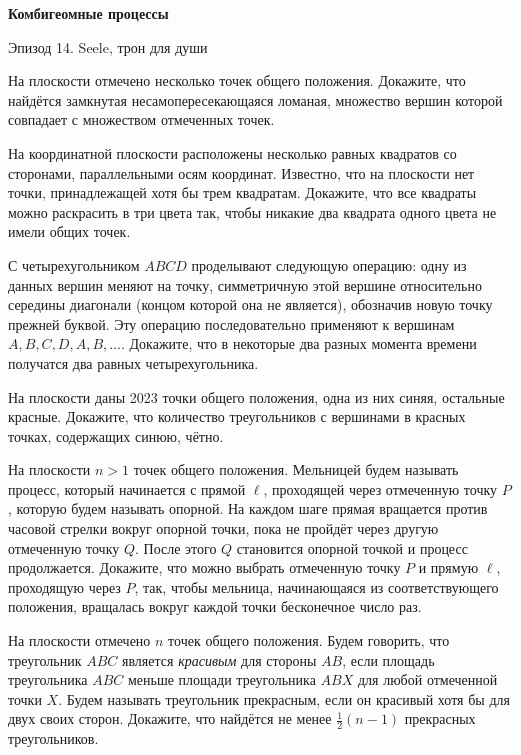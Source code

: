 \centerline{\bf \Huge Комбигеомные процессы}

\begin{flushright}
        \scriptsize{Эпизод 14. Seele, трон для души }
\end{flushright}

На плоскости отмечено несколько точек общего положения. Докажите, что найдётся замкнутая несамопересекающаяся ломаная, множество вершин которой совпадает с множеством отмеченных точек.

На координатной плоскости расположены несколько равных квадратов со сторонами, параллельными осям координат. Известно, что на плоскости нет точки, принадлежащей хотя бы трем квадратам. Докажите, что все квадраты можно раскрасить в три цвета так, чтобы никакие два квадрата одного цвета не имели общих точек.

С четырехугольником $A B C D$ проделывают следующую операцию: одну из данных вершин меняют на точку, симметричную этой вершине относительно середины диагонали (концом которой она не является), обозначив новую точку прежней буквой. Эту операцию последовательно применяют к вершинам $A, B, C, D, A, B, \ldots$. Докажите, что в некоторые два разных момента времени получатся два равных четырехугольника.

На плоскости даны 2023 точки общего положения, одна из них синяя, остальные красные. Докажите, что количество треугольников с вершинами в красных точках, содержащих синюю, чётно.

На плоскости $n>1$ точек общего положения. Мельницей будем называть процесс, который начинается с прямой $\ell$, проходящей через отмеченную точку $P$, которую будем называть опорной. На каждом шаге прямая вращается против часовой стрелки вокруг опорной точки, пока не пройдёт через другую отмеченную точку $Q$. После этого $Q$ становится опорной точкой и процесс продолжается. Докажите, что можно выбрать отмеченную точку $P$ и прямую $\ell$, проходящую через $P$, так, чтобы мельница, начинающаяся из соответствующего положения, вращалась вокруг каждой точки бесконечное число раз.

На плоскости отмечено $n$ точек общего положения. Будем говорить, что треугольник $A B C$ является \textit{красивым} для стороны $A B$, если площадь треугольника $A B C$ меньше площади треугольника $A B X$ для любой отмеченной точки $X$. Будем называть треугольник прекрасным, если он красивый хотя бы для двух своих сторон. Докажите, что найдётся не менее $\frac{1}{2}(n-1)$ прекрасных треугольников.